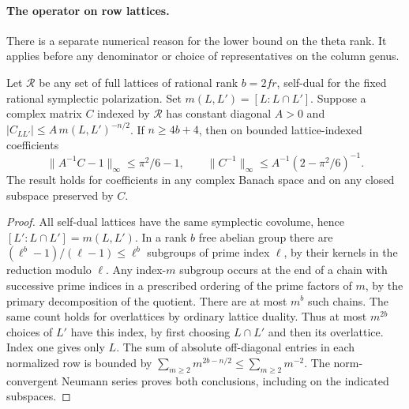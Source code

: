 \paragraph{The operator on row lattices.}
There is a separate numerical reason for the lower bound on the
theta rank. It applies before any denominator or choice of
representatives on the column genus.

\begin{lemma}\label{bfam:gram}
Let \(\mathcal R\) be any set of full lattices of rational rank
\(b=2fr\), self-dual for the fixed rational symplectic polarization.
Set \(m(L,L')=[L:L\cap L']\). Suppose a complex matrix \(C\)
indexed by \(\mathcal R\) has constant diagonal \(A>0\) and
\(|C_{LL'}|\le A\,m(L,L')^{-n/2}\).
If \(n\ge4b+4\), then on bounded lattice-indexed coefficients
\[
     \|A^{-1}C-1\|_\infty\le\pi^2/6-1,\qquad
     \|C^{-1}\|_\infty\le A^{-1}(2-\pi^2/6)^{-1}.
\]
The result holds for coefficients in any complex Banach space
and on any closed subspace preserved by \(C\).
\end{lemma}
\begin{proof}
All self-dual lattices have the same symplectic covolume, hence
\([L':L\cap L']=m(L,L')\). In a rank \(b\) free abelian group
there are \((\ell^b-1)/(\ell-1)\le\ell^b\) subgroups of prime
index \(\ell\), by their kernels in the reduction modulo \(\ell\).
Any index-\(m\) subgroup occurs at the end of a chain with
successive prime indices in a prescribed ordering of the prime
factors of \(m\), by the primary decomposition of the quotient.
There are at most \(m^b\) such chains. The same count holds for
overlattices by ordinary lattice duality. Thus at most \(m^{2b}\)
choices of \(L'\) have this index, by first choosing \(L\cap L'\)
and then its overlattice. Index one gives only \(L\). The sum of
absolute off-diagonal entries in each normalized row is bounded
by \(\sum_{m\ge2}m^{2b-n/2}\le\sum_{m\ge2}m^{-2}\).
The norm-convergent Neumann series proves both conclusions,
including on the indicated subspaces.
\end{proof}

